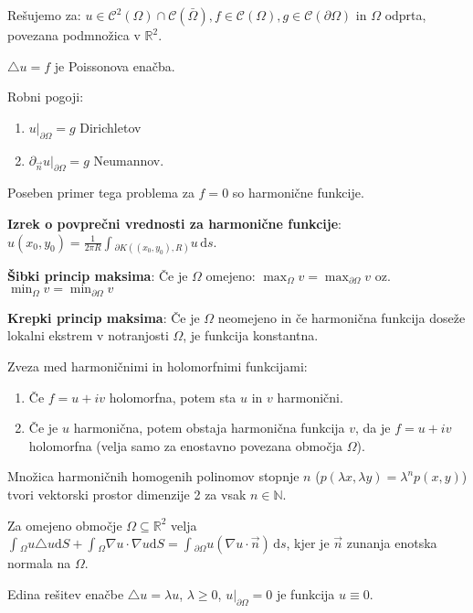 \documentclass[10pt,a4paper]{amsart}
\theoremstyle{definition} %
\theoremstyle{plain} %
\newcommand{\ds}{\ensuremath{\,\mathrm{d}s}}
\let\oldint\int
\renewcommand{\int}{\oldint \!}
\newcommand{\R}{\mathbb R}
\newcommand{\N}{\mathbb N}
\newcommand{\Cont}{\mathcal{C}}
\begin{document}
Rešujemo za: $u \in \Cont^2 ( \Omega) \cap \Cont (\bar{\Omega}), f \in \Cont (
\Omega ), g \in \Cont ( \partial \Omega )$ in $\Omega$ odprta, povezana
podmnožica v $\R^2$.

$\triangle u = f$ je Poissonova enačba.

Robni pogoji: \begin{enumerate}

\item $u|_{\partial \Omega} = g$ Dirichletov

\item $\partial_{\vec{n}} u |_{\partial \Omega} = g$ Neumannov.

\end{enumerate}

Poseben primer tega problema za $f=0$ so harmonične funkcije.

\textbf{Izrek o povprečni vrednosti za harmonične funkcije}: $u(x_0,y_0) =
\frac{1}{2\pi R} \int_{\partial K((x_0,y_0),R)}u \ds$.

\textbf{Šibki princip maksima}: Če je $\Omega$ omejeno: $\max_{\Omega} v =
\max_{\partial \Omega} v$ oz.  $\min_{\Omega} v = \min_{\partial \Omega} v$

\textbf{Krepki princip maksima}: Če je $\Omega$ neomejeno in če harmonična
funkcija doseže lokalni ekstrem v notranjosti $\Omega$, je funkcija konstantna.

Zveza med harmoničnimi in holomorfnimi funkcijami: \begin{enumerate}

\item Če $f = u + iv$ holomorfna, potem sta $u$ in $v$ harmonični.

\item Če je $u$ harmonična, potem obstaja harmonična funkcija $v$, da je $f = u
  + iv$ holomorfna (velja samo za enostavno povezana območja $\Omega$).

\end{enumerate}

Množica harmoničnih homogenih polinomov stopnje $n$ ($p(\lambda x,\lambda y) =
\lambda^n p(x,y)$) tvori vektorski prostor dimenzije 2 za vsak $n \in \N$.

Za omejeno območje $\Omega \subseteq \R^2$ velja $\int_\Omega u \triangle u
\mathrm{d}S + \int_\Omega \nabla u \cdot \nabla u \mathrm{d}S = \int_{\partial
\Omega} u(\nabla u \cdot \vec{n})\ds$, kjer je $\vec{n}$ zunanja enotska normala
na $\Omega$.

Edina rešitev enačbe $\triangle u = \lambda u$, $\lambda \geq 0$, $u|_{\partial
\Omega} = 0$ je funkcija $u \equiv 0$.
\end{document}
